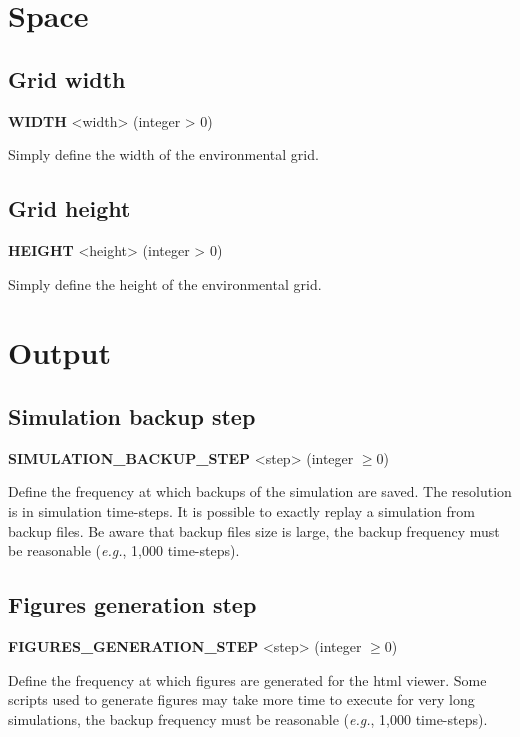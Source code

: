 \section{Space}

\subsection{Grid width}
\begin{center}
{\bf WIDTH} <width> (integer > 0)
\end{center}
Simply define the width of the environmental grid.


\subsection{Grid height}
\begin{center}
{\bf HEIGHT} <height> (integer > 0)
\end{center}
Simply define the height of the environmental grid.


\section{Output}

\subsection{Simulation backup step}
\begin{center}
{\bf SIMULATION\_BACKUP\_STEP} <step> (integer $\ge 0$)
\end{center}
Define the frequency at which backups of the simulation are saved. The resolution is in simulation time-steps. It is possible to exactly replay a simulation from backup files. Be aware that backup files size is large, the backup frequency must be reasonable (\textit{e.g.}, 1,000 time-steps).


\subsection{Figures generation step}
\begin{center}
{\bf FIGURES\_GENERATION\_STEP} <step> (integer $\ge 0$)
\end{center}
Define the frequency at which figures are generated for the html viewer. Some scripts used to generate figures may take more time to execute for very long simulations, the backup frequency must be reasonable (\textit{e.g.}, 1,000 time-steps).

